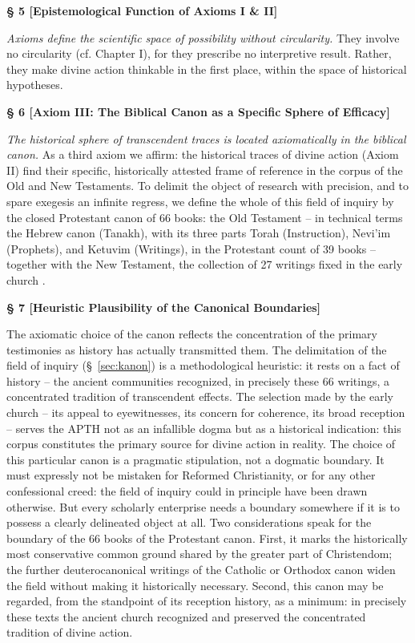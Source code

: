 \documentclass[11pt,a4paper]{article}
\makeatletter
\newcommand{\apth}{{\apthfont APTH}\hspace{0.15em}\xspace}
\newcommand{\apthsec}[3]{%
  \phantomsection%
  \def\@currentlabel{#1}%
  \label{sec:#3}%
  \textbf{§ #1 [#2]}%
}
\makeatother
\begin{document}
\apthsec{5}{Epistemological Function of Axioms I \& II}{axiom-funktion} 
\textit{Axioms define the scientific space of possibility without circularity.}
They involve no circularity (cf. Chapter I), for they prescribe no interpretive result. Rather, they make divine action thinkable in the first place, within the space of historical hypotheses.

\apthsec{6}{Axiom III: The Biblical Canon as a Specific Sphere of Efficacy}{kanon} 
\textit{The historical sphere of transcendent traces is located axiomatically in the biblical canon.}
As a third axiom we affirm: the historical traces of divine action (Axiom II) find their specific, historically attested frame of reference in the corpus of the Old and New Testaments. To delimit the object of research with precision, and to spare exegesis an infinite regress, we define the whole of this field of inquiry by the closed Protestant canon of 66 books: the Old Testament -- in technical terms the Hebrew canon (Tanakh), with its three parts Torah (Instruction), Nevi'im (Prophets), and Ketuvim (Writings), in the Protestant count of 39 books -- together with the New Testament, the collection of 27 writings fixed in the early church \citep{beckwith1985,metzger1987}.

\apthsec{7}{Heuristic Plausibility of the Canonical Boundaries}{kanon-heuristik} 
The axiomatic choice of the canon reflects the concentration of the primary testimonies as history has actually transmitted them. The delimitation of the field of inquiry (§~\ref{sec:kanon}) is a methodological heuristic: it rests on a fact of history -- the ancient communities recognized, in precisely these 66 writings, a concentrated tradition of transcendent effects. The selection made by the early church -- its appeal to eyewitnesses, its concern for coherence, its broad reception -- serves the \apth not as an infallible dogma but as a historical indication: this corpus constitutes the primary source for divine action in reality. The choice of this particular canon is a pragmatic stipulation, not a dogmatic boundary. It must expressly not be mistaken for Reformed Christianity, or for any other confessional creed: the field of inquiry could in principle have been drawn otherwise. But every scholarly enterprise needs a boundary somewhere if it is to possess a clearly delineated object at all. Two considerations speak for the boundary of the 66 books of the Protestant canon. First, it marks the historically most conservative common ground shared by the greater part of Christendom; the further deuterocanonical writings of the Catholic or Orthodox canon widen the field without making it historically necessary. Second, this canon may be regarded, from the standpoint of its reception history, as a minimum: in precisely these texts the ancient church recognized and preserved the concentrated tradition of divine action.
\end{document}
